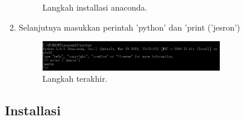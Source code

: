 \begin{enumerate}
\begin{figure}[ht]
\caption{Langkah installasi anaconda.}
\end{figure}
\item  Selanjutnya masukkan perintah 'python' dan 'print ('jesron')
\begin{figure}[ht]
\centerline{\includegraphics[width=0.75\textwidth]{figures/4.JPEG}}
\caption{Langkah terakhir.}
\end{figure}
\end{enumerate}

\subsection{Installasi}

